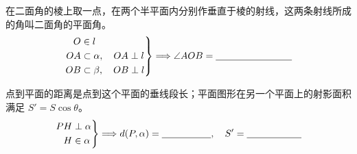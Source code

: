 \documentclass{exam-zh}
\begin{document}
\begin{problem}[points=5]
  \noindent
  \begin{minipage}[t]{\dimexpr\linewidth-55mm-6mm\relax}
    \vspace{0pt}
    在二面角的棱上取一点，在两个半平面内分别作垂直于棱的射线，这两条射线所成的角叫二面角的平面角。
\[
\left.
\begin{aligned}
O&\in l\\
OA&\subset\alpha,\quad OA\perp l\\
OB&\subset\beta,\quad OB\perp l
\end{aligned}
\right\}
\Longrightarrow
\angle AOB=\underline{\hspace{28mm}}
\]


  \end{minipage}\hfill
  \begin{diagramcoltikz}{55mm}{}
  }
  \end{diagramcoltikz}
  \par\medskip
\end{problem}



\begin{problem}[points=5]
  \noindent
  \begin{minipage}[t]{\dimexpr\linewidth-55mm-6mm\relax}
    \vspace{0pt}
    点到平面的距离是点到这个平面的垂线段长；平面图形在另一个平面上的射影面积满足 $S'=S\cos\theta$。
\[
\left.
\begin{aligned}
PH&\perp\alpha\\
H&\in\alpha
\end{aligned}
\right\}
\Longrightarrow
d(P,\alpha)=\underline{\hspace{18mm}},\quad S'=\underline{\hspace{20mm}}
\]


  \end{minipage}\hfill
  \begin{diagramcoltikz}{55mm}{}
  }
  \end{diagramcoltikz}
  \par\medskip
\end{problem}
\end{document}
